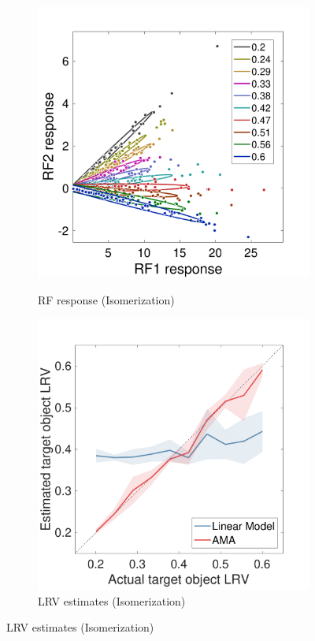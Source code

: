 \documentclass{jov}
\begin{document}
\begin{figure}
\centering
    \begin{subfigure}[b]{0.22	 \textwidth}   
        \caption{RF response (Isomerization)}
        \includegraphics[width=\textwidth]{../FiguresDraft4/Figure11/Figure11_a.pdf}
        \label{fig:isomerizationFails}
    \end{subfigure}
        \begin{subfigure}[b]{0.22 \textwidth}
        \caption{LRV estimates (Isomerization)}
        \includegraphics[width=\textwidth]{../FiguresDraft4/Figure11/Figure11_b.pdf}

\end{subfigure}
\end{figure}
\end{document}
